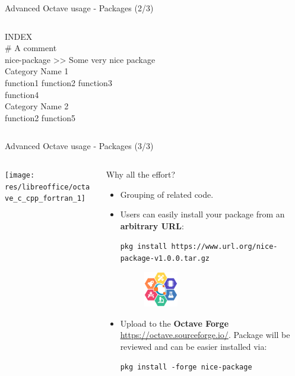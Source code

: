 \begin{frame}{Advanced Octave usage - Packages (2/3)}
\begin{columns}
\begin{column}{0.5\textwidth}
\colorbox{red!30}{INDEX} \\[0.5em]
\# A comment \\
nice-package >$ $> Some very nice package \\
Category Name 1 \\
 function1 function2 function3 \\
 function4 \\
Category Name 2 \\
 function2 function5 \\
\end{column}
\end{columns}
\end{frame}


\begin{frame}{Advanced Octave usage - Packages (3/3)}
\begin{columns}
\begin{column}[t]{0.2\textwidth}
\texttt{[image: res/libreoffice/octave\_c\_cpp\_fortran\_1]}
\end{column}
\begin{column}{0.75\textwidth}
\small
Why all the effort?
\begin{itemize}
\itemsep1em
\item
Grouping of related code.

\item
Users can easily install your package from an \textbf{arbitrary URL}:

\texttt{\footnotesize pkg install https://www.url.org/nice-package-v1.0.0.tar.gz}

\begin{figure}
\includegraphics[width=4em]{res/images/octave-flower}
\end{figure}

\item
Upload to the \textbf{Octave Forge} \url{https://octave.sourceforge.io/}.
Package will be reviewed and can be easier installed via:

\texttt{\footnotesize pkg install {\color{red!50!black}-forge} nice-package}

\end{itemize}
\end{column}
\end{columns}
\end{frame}
